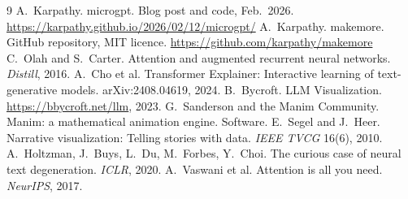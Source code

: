 \documentclass[10pt,twocolumn]{article}
\begin{document}
{\footnotesize
\begin{thebibliography}{9}\setlength{\itemsep}{1pt}
 A.~Karpathy. microgpt. Blog post and code, Feb.\ 2026. \url{https://karpathy.github.io/2026/02/12/microgpt/}
 A.~Karpathy. makemore. GitHub repository, MIT licence. \url{https://github.com/karpathy/makemore}
 C.~Olah and S.~Carter. Attention and augmented recurrent neural networks. \emph{Distill}, 2016.
 A.~Cho et al. Transformer Explainer: Interactive learning of text-generative models. arXiv:2408.04619, 2024.
 B.~Bycroft. LLM Visualization. \url{https://bbycroft.net/llm}, 2023.
 G.~Sanderson and the Manim Community. Manim: a mathematical animation engine. Software.
 E.~Segel and J.~Heer. Narrative visualization: Telling stories with data. \emph{IEEE TVCG} 16(6), 2010.
 A.~Holtzman, J.~Buys, L.~Du, M.~Forbes, Y.~Choi. The curious case of neural text degeneration. \emph{ICLR}, 2020.
 A.~Vaswani et al. Attention is all you need. \emph{NeurIPS}, 2017.
\end{thebibliography}}
\end{document}

